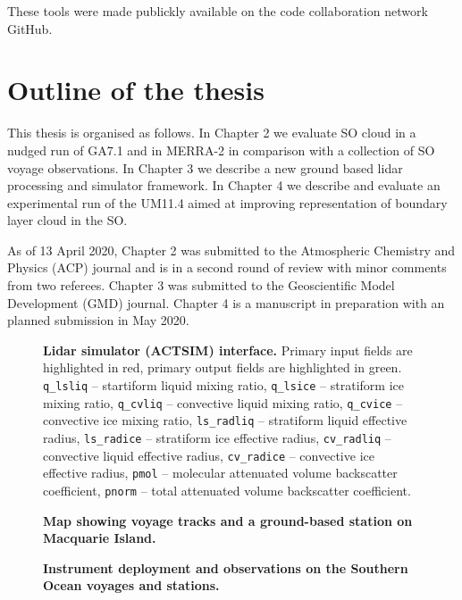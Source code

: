 \noindent
These tools were made publickly available on the code collaboration network GitHub.

\section{Outline of the thesis}

This thesis is organised as follows. In Chapter 2 we evaluate
SO cloud in a nudged run of GA7.1 and in MERRA-2 in comparison
with a collection of SO voyage observations. In Chapter 3 we
describe a new ground based lidar processing and simulator framework.
In Chapter 4 we describe and evaluate an experimental run of the UM11.4 aimed at
improving representation of boundary layer cloud in the SO.

As of 13 April 2020, Chapter 2 was submitted to the Atmospheric
Chemistry and Physics (ACP) journal and is in a second round of review
with minor comments from two referees. Chapter 3 was submitted to the
Geoscientific Model Development (GMD) journal. Chapter 4 is a manuscript
in preparation with an planned submission in May 2020.

\clearpage

\begin{figure}
\centering
\caption{
\textbf{Lidar simulator (ACTSIM) interface.}
Primary input fields are
highlighted in red, primary output fields are highlighted in green.
\texttt{q\_lsliq} -- startiform liquid mixing ratio, \texttt{q\_lsice} --
stratiform ice mixing
ratio, \texttt{q\_cvliq} -- convective liquid mixing ratio,
\texttt{q\_cvice} -- convective
ice mixing ratio, \texttt{ls\_radliq} -- stratiform liquid effective radius,
\texttt{ls\_radice} -- stratiform ice effective radius, \texttt{cv\_radliq} --
convective liquid effective radius, \texttt{cv\_radice} --
convective ice effective radius, \texttt{pmol} --
molecular attenuated volume backscatter coefficient, \texttt{pnorm} -- total
attenuated volume backscatter coefficient.
}
\label{fig:actsim}
\end{figure}


\begin{figure}
\centering
\caption{
\textbf{Map showing voyage tracks and a ground-based station on Macquarie Island.}
}
\label{fig:map}
\end{figure}

\begin{figure}
\centering
\caption{
\textbf{Instrument deployment and observations on the Southern Ocean voyages
and stations.}
}
\label{fig:instruments}
\end{figure}

